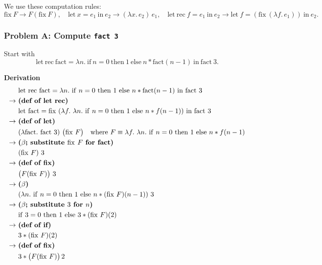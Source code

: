 \documentclass{article}
\theoremstyle{theorem}
\theoremstyle{definition}
\theoremstyle{remark}
\begin{document}
We use these computation rules:
\[
\mathrm{fix}\ F \to F(\mathrm{fix}\ F),\quad
\mathrm{let}\ x=e_1\ \mathrm{in}\ e_2 \to (\lambda x.\,e_2)\,e_1,\quad
\mathrm{let\ rec}\ f=e_1\ \mathrm{in}\ e_2 \to \mathrm{let}\ f=(\mathrm{fix}\ (\lambda f.\,e_1))\ \mathrm{in}\ e_2.
\]

\subsubsection*{Problem A: Compute \texttt{fact 3}}
Start with
\[
\mathrm{let\ rec}\ \mathrm{fact} = \lambda n.\ \mathrm{if}\ n=0\ \mathrm{then}\ 1\ \mathrm{else}\ n * \mathrm{fact}(n-1)\ \mathrm{in}\ \mathrm{fact}\ 3.
\]

\noindent\textbf{Derivation}
\[
\begin{aligned}
&\mathrm{let\ rec}\ \mathrm{fact}=\lambda n.\ \mathrm{if}\ n=0\ \mathrm{then}\ 1\ \mathrm{else}\ n * \mathrm{fact}(n-1)\ \mathrm{in}\ \mathrm{fact}\ 3\\
\to\ &\text{\textbf{(def of let rec)}}\\
&\mathrm{let}\ \mathrm{fact}=\mathrm{fix}\ (\lambda f.\ \lambda n.\ \mathrm{if}\ n=0\ \mathrm{then}\ 1\ \mathrm{else}\ n * f(n-1))\ \mathrm{in}\ \mathrm{fact}\ 3\\
\to\ &\text{\textbf{(def of let)}}\\
&(\lambda \mathrm{fact}.\ \mathrm{fact}\ 3)\ \big(\mathrm{fix}\ F\big)
\quad\text{where }F \equiv \lambda f.\ \lambda n.\ \mathrm{if}\ n=0\ \mathrm{then}\ 1\ \mathrm{else}\ n * f(n-1)\\
\to\ &\text{\textbf{($\beta$; substitute $\mathrm{fix}\ F$ for fact)}}\\
&(\mathrm{fix}\ F)\ 3\\
\to\ &\text{\textbf{(def of fix)}}\\
&\big(F(\mathrm{fix}\ F)\big)\ 3\\
\to\ &\text{\textbf{($\beta$)}}\\
&(\lambda n.\ \mathrm{if}\ n=0\ \mathrm{then}\ 1\ \mathrm{else}\ n * (\mathrm{fix}\ F)(n-1))\ 3\\
\to\ &\text{\textbf{($\beta$; substitute $3$ for $n$)}}\\
&\mathrm{if}\ 3=0\ \mathrm{then}\ 1\ \mathrm{else}\ 3 * (\mathrm{fix}\ F)(2)\\
\to\ &\text{\textbf{(def of if)}}\\
&3 * (\mathrm{fix}\ F)(2)\\
\to\ &\text{\textbf{(def of fix)}}\\
&3 * \big(F(\mathrm{fix}\ F)\big)\,2\\

\end{aligned}\]
\end{document}
